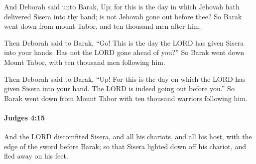 			\begin{versebox}
					\item[BHS] 
					\item[ASV] And Deborah said unto Barak, Up; for this is the day in which Jehovah hath delivered Sisera into thy hand; is not Jehovah gone out before thee? So Barak went down from mount Tabor, and ten thousand men after him.
					\item[NIV] Then Deborah said to Barak, “Go! This is the day the LORD has given Sisera into your hands. Has not the LORD gone ahead of you?” So Barak went down Mount Tabor, with ten thousand men following him.
					\item[NRSV] Then Deborah said to Barak, “Up! For this is the day on which the LORD has given Sisera into your hand. The LORD is indeed going out before you.” So Barak went down from Mount Tabor with ten thousand warriors following him.
			\end{versebox}

		\paragraph{Judges 4:15} %
			\label{JUDGES-4-15}

			And the LORD discomfited Sisera, and all his chariots, and all his host, with the edge of the sword before Barak; so that Sisera lighted down off his chariot, and fled away on his feet.

